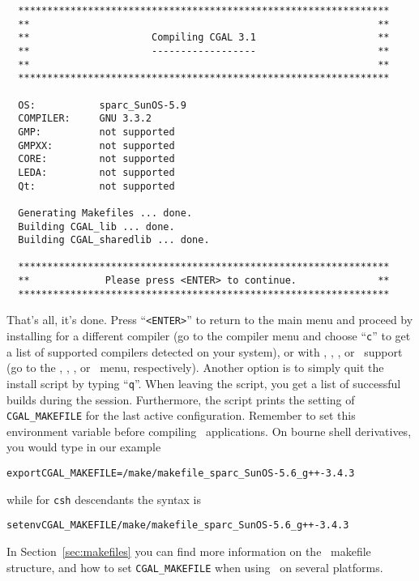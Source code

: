 {\ccTexHtml{\scriptsize}{}
\begin{verbatim}
  ****************************************************************
  **                                                            **
  **                     Compiling CGAL 3.1                     **
  **                     ------------------                     **
  **                                                            **
  ****************************************************************

  OS:           sparc_SunOS-5.9
  COMPILER:     GNU 3.3.2
  GMP:          not supported
  GMPXX:        not supported
  CORE:         not supported
  LEDA:         not supported
  Qt:           not supported

  Generating Makefiles ... done.
  Building CGAL_lib ... done.
  Building CGAL_sharedlib ... done.

  ****************************************************************
  **             Please press <ENTER> to continue.              **
  ****************************************************************
\end{verbatim}}
{
}  

That's all, it's done. Press ``\texttt{<ENTER>}'' to return to the
main menu and proceed by installing for a different compiler (go to
the compiler menu and choose ``\texttt{c}'' to get a list of supported
compilers detected on your system), or with \gmp, \core, \leda, or
\qt\ support (go to the \gmp, \core, \leda, or \qt\ menu,
respectively). Another option is to simply quit the install script by
typing ``\texttt{q}''. When leaving the script, you get a list of
successful builds during the session.  Furthermore, the script prints
the setting of \texttt{CGAL\_MAKEFILE} for the last active
configuration. Remember to set this environment variable before
compiling \cgal\ applications.  On bourne shell derivatives, you would
type in our example
\begin{alltt}
      export CGAL_MAKEFILE=\cgaldir/make/makefile_sparc_SunOS-5.6_g++-3.4.3
\end{alltt}
while for \texttt{csh} descendants the syntax is
\begin{alltt}
      setenv CGAL_MAKEFILE \cgaldir/make/makefile_sparc_SunOS-5.6_g++-3.4.3
\end{alltt}
In Section~\ref{sec:makefiles} you can find more information on the
\cgal\ makefile structure, and how to set \texttt{CGAL\_MAKEFILE} when
using \cgal\ on several platforms.


